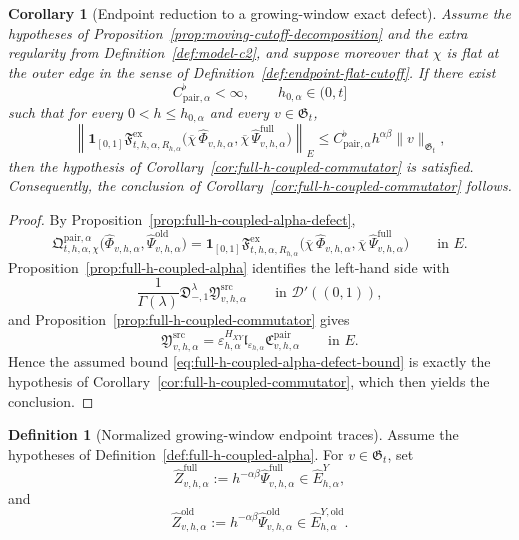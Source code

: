 \documentclass[11pt,a4paper]{amsart}
\theoremstyle{plain}
\newtheorem{corollary}[theorem]{Corollary}
\theoremstyle{definition}
\newtheorem{definition}[theorem]{Definition}
\theoremstyle{remark}
\newcommand{\one}{\mathbf 1}
\begin{document}
\begin{corollary}[Endpoint reduction to a growing-window exact defect]
\label{cor:full-h-coupled-alpha-defect}
Assume the hypotheses of Proposition~\ref{prop:moving-cutoff-decomposition} and the extra
regularity from Definition~\ref{def:model-c2}, and suppose moreover
that \(\chi\) is flat at the outer edge in the sense of Definition~\ref{def:endpoint-flat-cutoff}.
If there exist
\[
C_{\mathrm{pair},\alpha}^{\flat}<\infty,
\qquad
h_{0,\alpha}\in(0,t]
\]
such that for every \(0<h\le h_{0,\alpha}\) and every \(v\in\mathfrak G_t\),
\begin{equation}\label{eq:full-h-coupled-alpha-defect-bound}
\left\|
\one_{[0,1]}
\mathfrak F_{t,h,\alpha,R_{h,\alpha}}^{\mathrm{ex}}
\bigl(
\overline\chi\,\widehat\Phi_{v,h,\alpha},
\overline\chi\,\widehat\Psi_{v,h,\alpha}^{\mathrm{full}}
\bigr)
\right\|_{E}
\le
C_{\mathrm{pair},\alpha}^{\flat}
h^{\alpha\beta}\|v\|_{\mathfrak G_t},
\end{equation}
then the hypothesis of Corollary~\ref{cor:full-h-coupled-commutator} is satisfied. Consequently,
the conclusion of Corollary~\ref{cor:full-h-coupled-commutator} follows.
\end{corollary}

\begin{proof}
By Proposition~\ref{prop:full-h-coupled-alpha-defect},
\[
\mathfrak Q_{t,h,\alpha,\chi}^{\mathrm{pair},\alpha}
\bigl(
\widehat\Phi_{v,h,\alpha},
\widehat\Psi_{v,h,\alpha}^{\mathrm{old}}
\bigr)
=
\one_{[0,1]}
\mathfrak F_{t,h,\alpha,R_{h,\alpha}}^{\mathrm{ex}}
\bigl(
\overline\chi\,\widehat\Phi_{v,h,\alpha},
\overline\chi\,\widehat\Psi_{v,h,\alpha}^{\mathrm{full}}
\bigr)
\qquad\text{in }E.
\]
Proposition~\ref{prop:full-h-coupled-alpha} identifies the left-hand side with
\[
\frac{1}{\Gamma(\lambda)}
\mathfrak D_{-,1}^{\lambda}
\mathfrak Y_{v,h,\alpha}^{\mathrm{src}}
\qquad\text{in }\mathcal D'((0,1)),
\]
and Proposition~\ref{prop:full-h-coupled-commutator} gives
\[
\mathfrak Y_{v,h,\alpha}^{\mathrm{src}}
=
\varepsilon_{h,\alpha}^{H_{XY}}
\mathfrak l_{\varepsilon_{h,\alpha}}
\mathfrak C_{v,h,\alpha}^{\mathrm{pair}}
\qquad\text{in }E.
\]
Hence the assumed bound \eqref{eq:full-h-coupled-alpha-defect-bound} is exactly the hypothesis of
Corollary~\ref{cor:full-h-coupled-commutator}, which then yields the conclusion.
\end{proof}

\begin{definition}[Normalized growing-window endpoint traces]
\label{def:full-h-coupled-alpha-normalized}
Assume the hypotheses of Definition~\ref{def:full-h-coupled-alpha}. For \(v\in\mathfrak G_t\), set
\begin{equation}\label{eq:full-h-coupled-alpha-Z-full}
\widehat Z_{v,h,\alpha}^{\mathrm{full}}
:=
h^{-\alpha\beta}\widehat\Psi_{v,h,\alpha}^{\mathrm{full}}
\in
\widehat E_{h,\alpha}^{Y},
\end{equation}
and
\begin{equation}\label{eq:full-h-coupled-alpha-Z-old}
\widehat Z_{v,h,\alpha}^{\mathrm{old}}
:=
h^{-\alpha\beta}\widehat\Psi_{v,h,\alpha}^{\mathrm{old}}
\in
\widehat E_{h,\alpha}^{Y,\mathrm{old}}.
\end{equation}
\end{definition}
\end{document}
